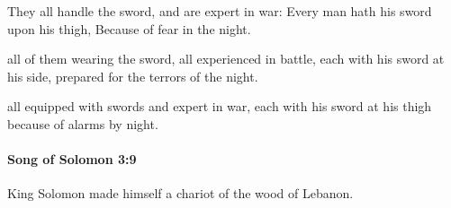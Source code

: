 			\begin{versebox}
					\item[BHS] 
					\item[LXX] 
					\item[ASV] They all handle the sword, and are expert in war: Every man hath his sword upon his thigh, Because of fear in the night.
					\item[NIV] all of them wearing the sword, all experienced in battle, each with his sword at his side, prepared for the terrors of the night.
					\item[NRSV] all equipped with swords and expert in war, each with his sword at his thigh because of alarms by night.
			\end{versebox}

		\paragraph{Song of Solomon 3:9} %
			\label{SONGOFSOLOMON-3-9}

			King Solomon made himself a chariot of the wood of Lebanon.

